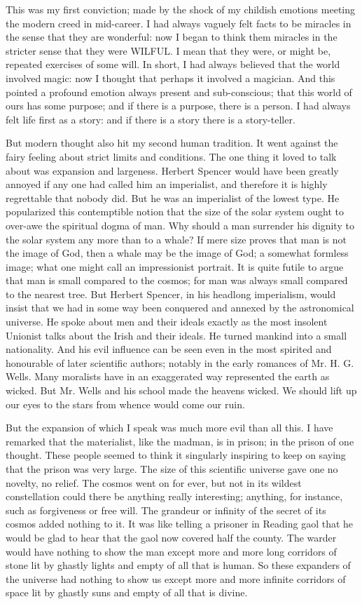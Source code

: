 This was my first conviction; made by the shock of my childish emotions meeting the modern creed in mid-career. I had always vaguely felt facts to be miracles in the sense that they are wonderful: now I began to think them miracles in the stricter sense that they were WILFUL. I mean that they were, or might be, repeated exercises of some will. In short, I had always believed that the world involved magic: now I thought that perhaps it involved a magician. And this pointed a profound emotion always present and sub-conscious; that this world of ours has some purpose; and if there is a purpose, there is a person. I had always felt life first as a story: and if there is a story there is a story-teller.

But modern thought also hit my second human tradition. It went against the fairy feeling about strict limits and conditions. The one thing it loved to talk about was expansion and largeness. Herbert Spencer would have been greatly annoyed if any one had called him an imperialist, and therefore it is highly regrettable that nobody did. But he was an imperialist of the lowest type. He popularized this contemptible notion that the size of the solar system ought to over-awe the spiritual dogma of man. Why should a man surrender his dignity to the solar system any more than to a whale? If mere size proves that man is not the image of God, then a whale may be the image of God; a somewhat formless image; what one might call an impressionist portrait. It is quite futile to argue that man is small compared to the cosmos; for man was always small compared to the nearest tree. But Herbert Spencer, in his headlong imperialism, would insist that we had in some way been conquered and annexed by the astronomical universe. He spoke about men and their ideals exactly as the most insolent Unionist talks about the Irish and their ideals. He turned mankind into a small nationality. And his evil influence can be seen even in the most spirited and honourable of later scientific authors; notably in the early romances of Mr. H. G. Wells. Many moralists have in an exaggerated way represented the earth as wicked. But Mr. Wells and his school made the heavens wicked. We should lift up our eyes to the stars from whence would come our ruin.

But the expansion of which I speak was much more evil than all this. I have remarked that the materialist, like the madman, is in prison; in the prison of one thought. These people seemed to think it singularly inspiring to keep on saying that the prison was very large. The size of this scientific universe gave one no novelty, no relief. The cosmos went on for ever, but not in its wildest constellation could there be anything really interesting; anything, for instance, such as forgiveness or free will. The grandeur or infinity of the secret of its cosmos added nothing to it. It was like telling a prisoner in Reading gaol that he would be glad to hear that the gaol now covered half the county. The warder would have nothing to show the man except more and more long corridors of stone lit by ghastly lights and empty of all that is human. So these expanders of the universe had nothing to show us except more and more infinite corridors of space lit by ghastly suns and empty of all that is divine.

